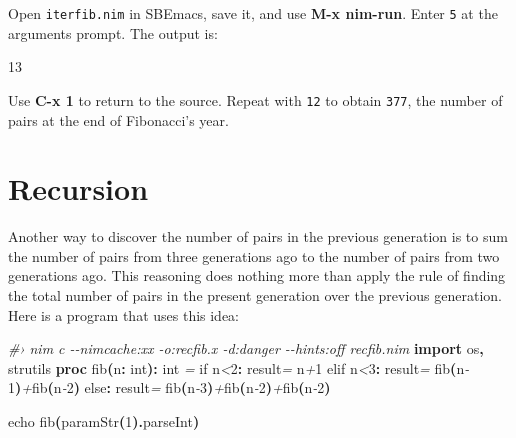 \documentclass[
  12pt,
]{book}
\newenvironment{Shaded}{}{}
\newcommand{\CommentTok}[1]{\textcolor[rgb]{0.38,0.63,0.69}{\textit{#1}}}
\newcommand{\DataTypeTok}[1]{\textcolor[rgb]{0.56,0.13,0.00}{#1}}
\newcommand{\DecValTok}[1]{\textcolor[rgb]{0.25,0.63,0.44}{#1}}
\newcommand{\KeywordTok}[1]{\textcolor[rgb]{0.00,0.44,0.13}{\textbf{#1}}}
\newcommand{\NormalTok}[1]{#1}
\newcommand{\OtherTok}[1]{\textcolor[rgb]{0.00,0.44,0.13}{#1}}
\newcommand{\StringTok}[1]{\textcolor[rgb]{0.25,0.44,0.63}{#1}}
\begin{document}
Open \texttt{iterfib.nim} in SBEmacs, save it, and use \textbf{M-x
nim-run}. Enter \texttt{5} at the arguments prompt. The output is:

\begin{Shaded}
\begin{Highlighting}[]
\NormalTok{13}
\end{Highlighting}
\end{Shaded}

Use \textbf{C-x 1} to return to the source. Repeat with \texttt{12} to
obtain \texttt{377}, the number of pairs at the end of Fibonacci's year.

\section{Recursion}\label{recursion}

Another way to discover the number of pairs in the previous generation
is to sum the number of pairs from three generations ago to the number
of pairs from two generations ago. This reasoning does nothing more than
apply the rule of finding the total number of pairs in the present
generation over the previous generation. Here is a program that uses
this idea:

\begin{Shaded}
\begin{Highlighting}[]
\CommentTok{\#› nim c {-}{-}nimcache:xx {-}o:recfib.x {-}d:danger {-}{-}hints:off recfib.nim}
\KeywordTok{import}\NormalTok{ os}\KeywordTok{,}\NormalTok{ strutils}
\KeywordTok{proc }\StringTok{fib}\KeywordTok{(}\NormalTok{n}\KeywordTok{:} \DataTypeTok{int}\KeywordTok{):} \DataTypeTok{int} \CommentTok{=}
  \DataTypeTok{if}\NormalTok{ n}\CommentTok{\textless{}}\DecValTok{2}\KeywordTok{:} \OtherTok{result}\CommentTok{=}\NormalTok{ n}\CommentTok{+}\DecValTok{1}
  \DataTypeTok{elif}\NormalTok{ n}\CommentTok{\textless{}}\DecValTok{3}\KeywordTok{:} \OtherTok{result}\CommentTok{=} \DataTypeTok{fib}\KeywordTok{(}\NormalTok{n}\CommentTok{{-}}\DecValTok{1}\KeywordTok{)}\CommentTok{+}\DataTypeTok{fib}\KeywordTok{(}\NormalTok{n}\CommentTok{{-}}\DecValTok{2}\KeywordTok{)}
  \DataTypeTok{else}\KeywordTok{:} \OtherTok{result}\CommentTok{=} \DataTypeTok{fib}\KeywordTok{(}\NormalTok{n}\CommentTok{{-}}\DecValTok{3}\KeywordTok{)}\CommentTok{+}\DataTypeTok{fib}\KeywordTok{(}\NormalTok{n}\CommentTok{{-}}\DecValTok{2}\KeywordTok{)}\CommentTok{+}\DataTypeTok{fib}\KeywordTok{(}\NormalTok{n}\CommentTok{{-}}\DecValTok{2}\KeywordTok{)}

\DataTypeTok{echo} \DataTypeTok{fib}\KeywordTok{(}\DataTypeTok{paramStr}\KeywordTok{(}\DecValTok{1}\KeywordTok{).}\DataTypeTok{parseInt}\KeywordTok{)}
\end{Highlighting}
\end{Shaded}
\end{document}
